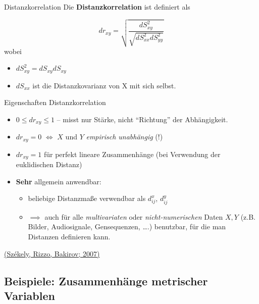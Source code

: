 \documentclass[
  10pt,
  ignorenonframetext,
]{beamer}
\providecommand{\tightlist}{%
  \setlength{\itemsep}{0pt}\setlength{\parskip}{0pt}}
\begin{document}
\begin{frame}{Distanzkorrelation}
\label{distanzkorrelation}
Die \textbf{Distanzkorrelation} ist definiert als

\[dr_{xy} = \sqrt{\frac{dS^2_{xy}}{\sqrt{dS^2_{xx}dS^2_{yy}}}}\] wobei

\begin{itemize}
\tightlist
\item
  \(dS^2_{xy} = dS_{xy}dS_{xy}\)
\item
  \(dS_{xx}\) ist die Distanzkovarianz von X mit sich selbst.
\end{itemize}
\end{frame}

\begin{frame}{Eigenschaften Distanzkorrelation}
\label{eigenschaften-distanzkorrelation}
\begin{itemize}
\item
  \(0 \leq dr_{xy} \leq 1\) -- misst nur Stärke, nicht ``Richtung'' der
  Abhängigkeit.
\item
  \(dr_{xy} = 0\) \(\iff\) \(X\) und \(Y\) \emph{empirisch unabhängig}
  (!)
\item
  \(dr_{xy} = 1\) für perfekt lineare Zusammenhänge (bei Verwendung der
  euklidischen Distanz)
\item
  \textbf{Sehr} allgemein anwendbar:

  \begin{itemize}
  \tightlist
  \item
    beliebige Distanzmaße verwendbar als \(d^x_{i j}\), \(d^y_{i j}\)
  \item
    \(\implies\) auch für alle \emph{multivariaten} oder
    \emph{nicht-numerischen} Daten \(X, Y\) (z.B. Bilder, Audiosignale,
    Gensequenzen, \ldots.) benutzbar, für die man Distanzen definieren
    kann.
  \end{itemize}
\end{itemize}

\vspace{4em}
\scriptsize

\href{https://doi.org/10.1214\%2F009053607000000505}{(Székely, Rizzo,
Bakirov; 2007)}

\scriptsize\normalsize
\end{frame}

\subsection{Beispiele: Zusammenhänge metrischer
Variablen}\label{beispiele-zusammenhuxe4nge-metrischer-variablen}
\end{document}
